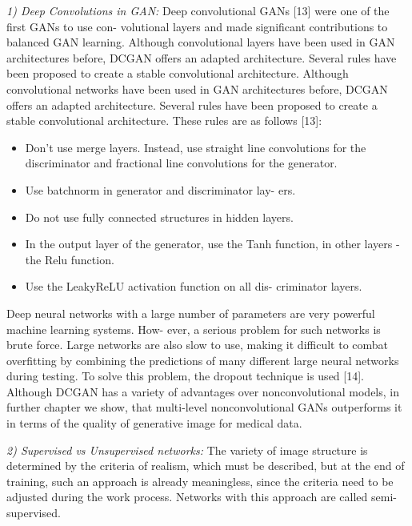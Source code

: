 \documentclass[10pt, a4paper]{article}
\begin{document}
\begin{multicols}{2}
\textit{1) Deep Convolutions in GAN:} Deep convolutional GANs [13] were one of the first GANs to use con- volutional layers and made significant contributions to balanced GAN learning. Although convolutional layers have been used in GAN architectures before, DCGAN offers an adapted architecture. Several rules have been proposed to create a stable convolutional architecture. Although convolutional networks have been used in GAN architectures before, DCGAN offers an adapted architecture. Several rules have been proposed to create a stable convolutional architecture. These rules are as follows [13]: 
\begin{itemize}[left=1em] %
    \item Don’t use merge layers. Instead, use straight line convolutions for the discriminator and fractional line convolutions for the generator.
    \item Use batchnorm in generator and discriminator lay- ers.
\item Do not use fully connected structures in hidden layers.
\item In the output layer of the generator, use the Tanh function, in other layers - the Relu function.
\item Use the LeakyReLU activation function on all dis- criminator layers. 
\end{itemize}
\vspace{0.2cm}

Deep neural networks with a large number of parameters are very powerful machine learning systems. How- ever, a serious problem for such networks is brute force. Large networks are also slow to use, making it difficult to combat overfitting by combining the predictions of many different large neural networks during testing. To solve this problem, the dropout technique is used [14]. Although DCGAN has a variety of advantages over nonconvolutional models, in further chapter we show, that multi-level nonconvolutional GANs outperforms it in terms of the quality of generative image for medical data.

\textit{2) Supervised vs Unsupervised networks:} The variety of image structure is determined by the criteria of realism, which must be described, but at the end of training, such an approach is already meaningless, since the criteria need to be adjusted during the work process. Networks with this approach are called semi-supervised.


\end{multicols}
\end{document}
